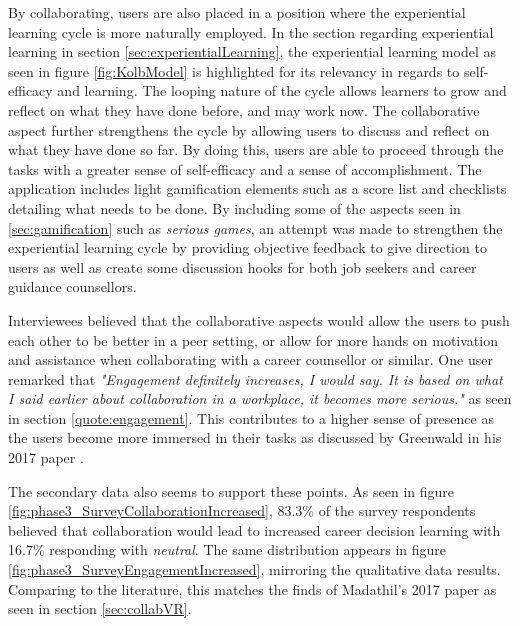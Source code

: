 By collaborating, users are also placed in a position where the experiential learning cycle is more naturally employed. In the section regarding experiential learning in section \ref{sec:experientialLearning}, the experiential learning model as seen in figure \ref{fig:KolbModel} is highlighted for its relevancy in regards to self-efficacy and learning. The looping nature of the cycle allows learners to grow and reflect on what they have done before, and may work now. The collaborative aspect further strengthens the cycle by allowing users to discuss and reflect on what they have done so far.  By doing this, users are able to proceed through the tasks with a greater sense of self-efficacy and a sense of accomplishment. The application includes light gamification elements such as a score list and checklists detailing what needs to be done. By including some of the aspects seen in \ref{sec:gamification} such as \textit{serious games}, an attempt was made to strengthen the experiential learning cycle by providing objective feedback to give direction to users as well as create some discussion hooks for both job seekers and career guidance counsellors.

Interviewees believed that the collaborative aspects would allow the users to push each other to be better in a peer setting, or allow for more hands on motivation and assistance when collaborating with a career counsellor or similar. One user remarked that \textit{"Engagement definitely increases,  I would say.  It is based on what I said earlier about collaboration in a workplace, it becomes more serious."} as seen in section \ref{quote:engagement}. This contributes to a higher sense of presence as the users become more immersed in their tasks as discussed by Greenwald in his 2017 paper \cite{greenwald2017technology}.




The secondary data also seems to support these points. As seen in figure \ref{fig:phase3_SurveyCollaborationIncreased}, 83.3\% of the survey respondents believed that collaboration would lead to increased career decision learning with 16.7\% responding with \textit{neutral}. The same distribution appears in figure \ref{fig:phase3_SurveyEngagementIncreased}, mirroring the qualitative data results. Comparing to the literature, this matches the finds of Madathil's 2017 paper \cite{madathil2017investigation} as seen in section \ref{sec:collabVR}.

